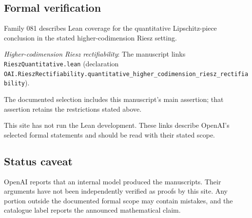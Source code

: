 \documentclass[11pt]{article}
\begin{document}
\subsection{Formal verification}
Family 081 describes Lean coverage for the quantitative Lipschitz-piece conclusion in the stated higher-codimension Riesz setting.

\textit{Higher-codimension Riesz rectifiability}: The manuscript links \texttt{RieszQuantitative.lean} (declaration \texttt{OAI.RieszRectifiability.quantitative\_higher\_codimension\_riesz\_rectifiability}).

The documented selection includes this manuscript’s main assertion; that assertion retains the restrictions stated above.

This site has not run the Lean development. These links describe OpenAI’s selected formal statements and should be read with their stated scope.

\subsection{Status caveat}
OpenAI reports that an internal model produced the manuscripts. Their arguments have not been independently verified as proofs by this site. Any portion outside the documented formal scope may contain mistakes, and the catalogue label reports the announced mathematical claim.
\end{document}
